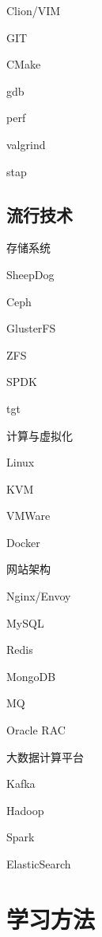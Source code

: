 \begin{enumbox}
\item Clion/VIM
\item GIT
\item CMake
\item gdb
\item perf
\item valgrind
\item stap
\end{enumbox}

\subsection{流行技术}

存储系统
\begin{enumbox}
\item SheepDog
\item Ceph
\item GlusterFS
\item ZFS
\item SPDK
\item tgt
\end{enumbox}

计算与虚拟化
\begin{enumbox}
\item Linux
\item KVM
\item VMWare
\item Docker
\end{enumbox}

网站架构
\begin{enumbox}
\item Nginx/Envoy
\item MySQL
\item Redis
\item MongoDB
\item MQ
\item Oracle RAC
\end{enumbox}

大数据计算平台
\begin{enumbox}
\item Kafka
\item Hadoop
\item Spark
\item ElasticSearch
\end{enumbox}

\section{学习方法}


